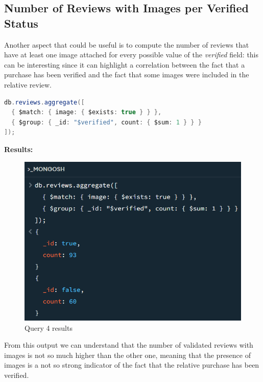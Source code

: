 \subsection{Number of Reviews with Images per Verified Status}
Another aspect that could be useful is to compute the number of reviews that have at least one image attached for every possible value of the \textit{verified} field: this can be interesting since it can highlight a correlation between the fact that a purchase has been verified and the fact that some images were included in the relative review. \\
\begin{lstlisting}[language=Java]
db.reviews.aggregate([
  { $match: { image: { $exists: true } } },
  { $group: { _id: "$verified", count: { $sum: 1 } } }
]);
\end{lstlisting}
\textbf{Results:}
\begin{figure}[H]
  \centering
  \includegraphics[scale=1]{Images/q4_result.png}
  \caption{Query 4 results}
  \label{fig:q4_result}
\end{figure}
From this output we can understand that the number of validated reviews with images is not so much higher than the other one, meaning that the presence of images is a not so strong indicator of the fact that the relative purchase has been verified. \\

